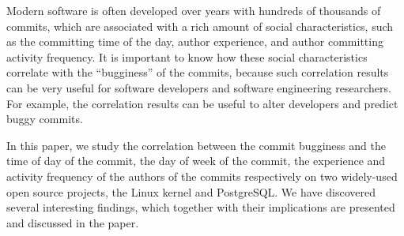 
Modern software is often developed over years with hundreds of thousands of 
commits, which are associated with a rich amount of social characteristics, such as
the committing time of the day, author experience, and author committing activity frequency. 
It is important to know how these social characteristics correlate with the ``bugginess''
of the commits, because such correlation results can be very useful for
software developers and software engineering researchers.
For example, the correlation results can be useful to alter developers 
and predict buggy commits.

In this paper, we study the correlation between
the commit bugginess and the time of day of the commit, the day of week of the commit,
the experience and activity frequency of the authors of the commits respectively on
two widely-used open source projects, the Linux kernel and PostgreSQL.
We have discovered several interesting findings, which together with their implications
are presented and discussed in the paper.




